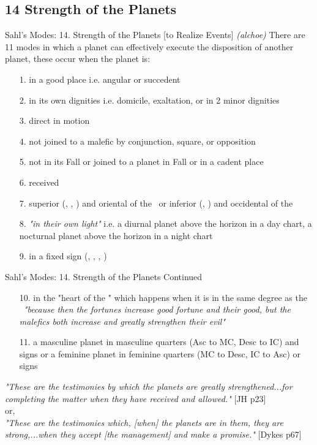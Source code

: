 \subsection{14 Strength of the Planets}
\begin{frame}[t]{Sahl's Modes: 14. Strength of the Planets [to Realize Events]}
\textsl{(alchoe)} There are 11 modes in which a planet can effectively execute the disposition of another planet, these occur when the planet is:
\begin{enumerate}
\item[1.] in a good place i.e. angular or succedent
\item[2.] in its own dignities i.e. domicile, exaltation, or in 2 minor dignities
\item[3.] direct in motion
\item[4.] not joined to a malefic by conjunction, square, or opposition
\item[5.] not in its Fall or joined to a planet in Fall or in a cadent place
\item[6.] received
\item[7.] superior (\Mars, \Jupiter, \Saturn) and oriental of the \Sun\ or inferior (\Mercury, \Venus) and occidental of the \Sun
\item[8.] \textsl{"in their own light"} i.e. a diurnal planet above the horizon in a day chart, a nocturnal planet above the horizon in a night chart
\item[9.] in a fixed sign (\Taurus, \Leo, \Scorpio, \Aquarius)
\end{enumerate}
\end{frame}
\begin{frame}[t]{Sahl's Modes: 14. Strength of the Planets Continued}
\begin{enumerate}
\item[10.] in the "heart of the \Sun" which happens when it is in the same degree as the \Sun\ \textsl{"because then the fortunes increase good fortune and their good, but the malefics both increase and greatly strengthen their evil"}\footnotemark[1]

\item[11.] a masculine planet in masculine quarters (Asc to MC, Desc to IC) and signs or a feminine planet in feminine quarters (MC to Desc, IC to Asc) or signs
\end{enumerate}
\textsl{"These are the testimonies by which the planets are greatly strengthened...for completing the matter when they have received and allowed."} [JH p23] \\ 
or, \\
\textsl{"These are the testimonies which, [when] the planets are in them, they are strong,...when they accept [the management] and make a promise."} [Dykes p67]


\end{frame}
